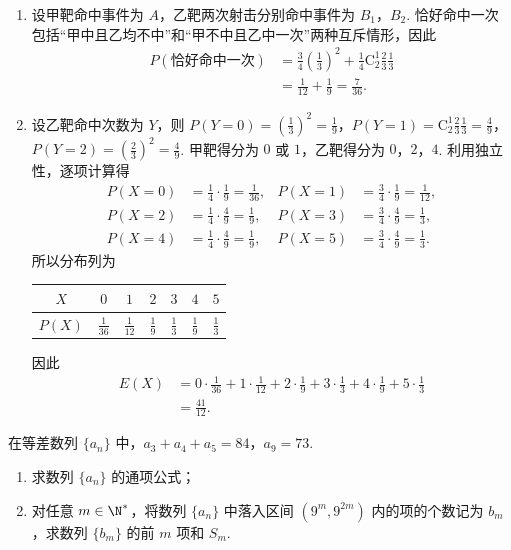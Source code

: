 \begin{solution}
\begin{enumerate}
\item
设甲靶命中事件为 \(A\)，乙靶两次射击分别命中事件为 \(B_1\)，\(B_2\). 恰好命中一次包括“甲中且乙均不中”和“甲不中且乙中一次”两种互斥情形，因此
\[
\begin{aligned}
P(\text{恰好命中一次})
&=\frac34\left(\frac13\right)^2
+\frac14\mathrm C_{2}^{1}\frac23\frac13\\
&=\frac1{12}+\frac19=\frac7{36}.
\end{aligned}
\]
\item
设乙靶命中次数为 \(Y\)，则
\(P(Y=0)=\left(\frac13\right)^2=\frac19\)，\(P(Y=1)=\mathrm C_{2}^{1}\frac23\frac13=\frac49\)，\(P(Y=2)=\left(\frac23\right)^2=\frac49\).
甲靶得分为 \(0\) 或 \(1\)，乙靶得分为 \(0\)，\(2\)，\(4\). 利用独立性，逐项计算得
\[
\begin{aligned}
P(X=0)&=\frac14\cdot\frac19=\frac1{36},&
P(X=1)&=\frac34\cdot\frac19=\frac1{12},\\
P(X=2)&=\frac14\cdot\frac49=\frac19,&
P(X=3)&=\frac34\cdot\frac49=\frac13,\\
P(X=4)&=\frac14\cdot\frac49=\frac19,&
P(X=5)&=\frac34\cdot\frac49=\frac13.
\end{aligned}
\]
所以分布列为
\begin{center}
\begin{tabular}{c|cccccc}
\(X\)&\(0\)&\(1\)&\(2\)&\(3\)&\(4\)&\(5\)\\ \hline
\(P(X)\)&\(\frac1{36}\)&\(\frac1{12}\)&\(\frac19\)&\(\frac13\)&\(\frac19\)&\(\frac13\)
\end{tabular}
\end{center}
因此
\[
\begin{aligned}
E(X)
&=0\cdot\frac1{36}+1\cdot\frac1{12}+2\cdot\frac19
 +3\cdot\frac13+4\cdot\frac19+5\cdot\frac13\\
&=\frac{41}{12}.
\end{aligned}
\]
\end{enumerate}
\end{solution}

\begin{problem}
在等差数列 \(\{a_{n}\}\) 中，\(a_{3} + a_{4} + a_{5} = 84\)，\(a_{9} = 73\).
\begin{enumerate}
\item 求数列 \(\{a_{n}\}\) 的通项公式；
\item 对任意 \(m \in \N^*\)，将数列 \(\{a_n\}\) 中落入区间 \((9^m, 9^{2m})\) 内的项的个数记为 \(b_m\)，求数列 \(\{b_m\}\) 的前 \(m\) 项和 \(S_m\).
\end{enumerate}
\end{problem}

